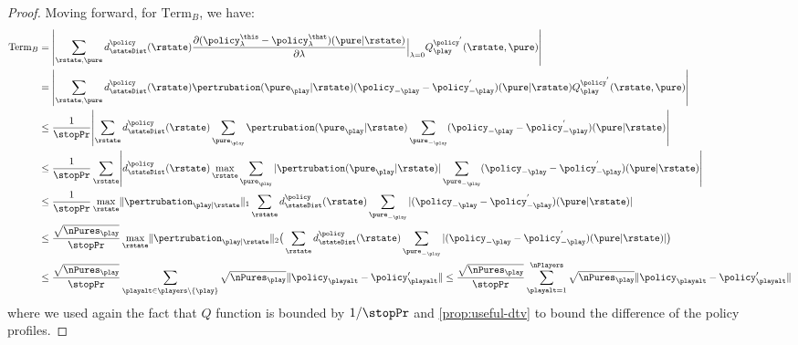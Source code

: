 \begin{proof}
Moving forward, for $\mathrm{Term}_B$, we have:
\begin{align}
\mathrm{Term}_B
	&=\abs*{  \sum_{\rstate,\pure}
\visitDistr{\stateDist}{\policy_{}}(\rstate)\frac{\pd(\policy_{\lambda}^{\this}-\policy_{\lambda}^{\that})(\pure \vert \rstate)}{\pd \lambda}\Big|_{\lambda=0}Q_{\play}^{\policy_{}^{'}}(\rstate,\pure)}
	\notag\\
	&=\abs*{  \sum_{\rstate,\pure} \visitDistr{\stateDist}{\policy_{}}(\rstate)\pertrubation(\pure_\play\vert\rstate)(\policy_{-\play}-\policy_{-\play}^{'})(\pure \vert \rstate)Q_{\play}^{\policy_{}^{'}}(\rstate,\pure)}
	\notag\\
	&\leq\frac{1}{\stopPr}\abs*{  \sum_{\rstate}
\visitDistr{\stateDist}{\policy_{}}(\rstate)\sum_{\pure_\play}\pertrubation(\pure_\play\vert\rstate)\sum_{\pure_{-\play}}(\policy_{-\play}-\policy_{-\play}^{'})(\pure \vert \rstate)}
	\notag\\
	&\leq\frac{1}{\stopPr} \sum_{\rstate}\abs*{
\visitDistr{\stateDist}{\policy_{}}(\rstate)\max_{\rstate}\sum_{\pure_\play}|\pertrubation(\pure_\play\vert\rstate)|\sum_{\pure_{-\play}}(\policy_{-\play}-\policy_{-\play}^{'})(\pure \vert \rstate)}
	\notag\\
	&\leq\frac{1}{\stopPr} \max_{\rstate}\norm{\pertrubation_{\play\vert\rstate}}_1 \sum_{\rstate}
\visitDistr{\stateDist}{\policy_{}}(\rstate)\sum_{\pure_{-\play}}|(\policy_{-\play}-\policy_{-\play}^{'})(\pure \vert \rstate)|
	\notag\\
	&\leq\frac{\sqrt{\nPures_{\play}}}{\stopPr} \max_{\rstate}\norm{\pertrubation_{\play\vert\rstate}}_2 \big(\sum_{\rstate}
\visitDistr{\stateDist}{\policy_{}}(\rstate)\sum_{\pure_{-\play}}|(\policy_{-\play}-\policy_{-\play}^{'})(\pure \vert \rstate)|\big)
	\notag\\
	&\leq \frac{\sqrt{\nPures_{\play}}}{\stopPr}\sum_{\playalt\in\players\setminus\{\play\}}\sqrt{\nPures_{\play}}\norm{\policy_\playalt-\policy'_\playalt}
\leq\frac{\sqrt{\nPures_{\play}}}{\stopPr}\sum_{\playalt=1}^{\nPlayers}\sqrt{\nPures_{\play}}\norm{\policy_\playalt-\policy'_\playalt}
\end{align}
where we used again the fact that $Q$ function is bounded by $1/\stopPr$ and \cref{prop:useful-dtv} to bound the difference of the policy profiles.


\end{proof}
